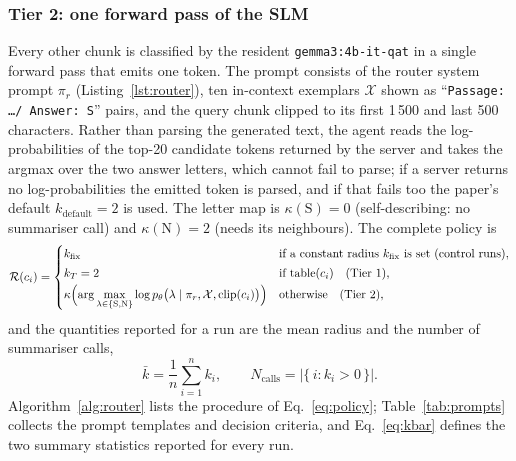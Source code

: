 \documentclass[pdflatex,sn-mathphys-num]{sn-jnl}
\theoremstyle{thmstyleone}%
\theoremstyle{thmstylethree}%
\begin{document}
\subsubsection{Tier 2: one forward pass of the SLM}
Every other chunk is classified by the resident \texttt{gemma3:4b-it-qat} in a single forward pass that emits one token. The prompt consists of the router system prompt $\pi_r$ (Listing~\ref{lst:router}), ten in-context exemplars $\mathcal X$ shown as ``\texttt{Passage: \ldots / Answer: S}'' pairs, and the query chunk clipped to its first 1\,500 and last 500 characters. Rather than parsing the generated text, the agent reads the log-probabilities of the top-20 candidate tokens returned by the server and takes the argmax over the two answer letters, which cannot fail to parse; if a server returns no log-probabilities the emitted token is parsed, and if that fails too the paper's default $k_{\mathrm{default}}=2$ is used. The letter map is $\kappa(\mathrm S)=0$ (self-describing: no summariser call) and $\kappa(\mathrm N)=2$ (needs its neighbours). The complete policy is
\begin{equation}\label{eq:policy}
\mathcal R(c_i)=
\begin{cases}
k_{\mathrm{fix}} & \text{if a constant radius } k_{\mathrm{fix}} \text{ is set (control runs)},\\[2pt]
k_T=2 & \text{if } \mathrm{table}(c_i) \quad\text{(Tier 1)},\\[2pt]
\kappa\Bigl(\displaystyle\arg\max_{\lambda\in\{\mathrm S,\mathrm N\}}\log p_\theta\bigl(\lambda\mid \pi_r,\mathcal X,\mathrm{clip}(c_i)\bigr)\Bigr) & \text{otherwise} \quad\text{(Tier 2)},
\end{cases}
\end{equation}
and the quantities reported for a run are the mean radius and the number of summariser calls,
\begin{equation}\label{eq:kbar}
\bar k=\frac1n\sum_{i=1}^{n}k_i,\qquad N_{\mathrm{calls}}=\bigl|\{\,i : k_i>0\,\}\bigr| .
\end{equation}
Algorithm~\ref{alg:router} lists the procedure of Eq.~\eqref{eq:policy}; Table~\ref{tab:prompts} collects the prompt templates and decision criteria, and Eq.~\eqref{eq:kbar} defines the two summary statistics reported for every run.
\end{document}
